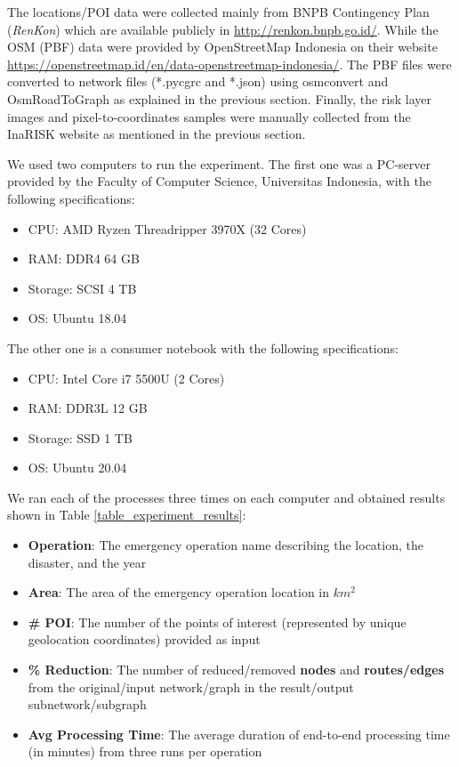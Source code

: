 \documentclass[conference]{IEEEtran}
\begin{document}
The locations/POI data were collected mainly from BNPB Contingency Plan (\textit{RenKon}) which are available publicly in \url{http://renkon.bnpb.go.id/}. While the OSM (PBF) data were provided by OpenStreetMap Indonesia on their website \url{https://openstreetmap.id/en/data-openstreetmap-indonesia/}. The PBF files were converted to network files (*.pycgrc and *.json) using osmconvert\cite{OpenStreetMap2019OsmConvert} and OsmRoadToGraph\cite{Gemsa2017OsmToRoadGraph} as explained in the previous section. Finally, the risk layer images and pixel-to-coordinates samples were manually collected from the InaRISK website as mentioned in the previous section.

We used two computers to run the experiment. The first one was a PC-server provided by the Faculty of Computer Science, Universitas Indonesia, with the following specifications:

\begin{itemize}
\item CPU: AMD Ryzen Threadripper 3970X (32 Cores)
\item RAM: DDR4 64 GB
\item Storage: SCSI 4 TB
\item OS: Ubuntu 18.04
\end{itemize}

The other one is a consumer notebook with the following specifications:

\begin{itemize}
\item CPU: Intel Core i7 5500U (2 Cores)
\item RAM: DDR3L 12 GB
\item Storage: SSD 1 TB
\item OS: Ubuntu 20.04
\end{itemize}

We ran each of the processes three times on each computer and obtained results shown in Table \ref{table_experiment_results}:

\begin{itemize}
\item \textbf{Operation}: The emergency operation name describing the location, the disaster, and the year
\item \textbf{Area}: The area of the emergency operation location in $km^2$
\item \textbf{\# POI}: The number of the points of interest (represented by unique geolocation coordinates) provided as input
\item \textbf{\% Reduction}: The number of reduced/removed \textbf{nodes} and \textbf{routes/edges} from the original/input network/graph in the result/output subnetwork/subgraph
\item \textbf{Avg Processing Time}: The average duration of end-to-end processing time (in minutes) from three runs per operation
\end{itemize}
\end{document}
